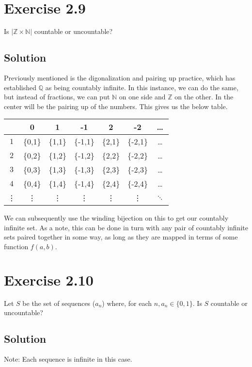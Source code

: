 \documentclass[12pt]{report}
\begin{document}
\pagebreak
\section{Exercise 2.9}
Is $|\mathbb{Z \times N}|$ countable or uncountable? 

\subsection*{Solution}
Previously mentioned is the digonalization and pairing up practice, which has established $\mathbb{Q}$ as being countably infinite. 
In this instance, we can do the same, but instead of fractions, we can put $\mathbb{N}$ on one side and $\mathbb{Z}$ on the other. 
In the center will be the pairing up of the numbers.
This gives us the below table.
\begin{center}
    \begin{tabular}{c| c c c c c c}
            &0  &1  &-1 &2  &-2 &\dots\\
        \hline
        $1$ &\{0,1\}    &\{1,1\}    &\{-1,1\}   &\{2,1\}    &\{-2,1\}   &\dots\\
        $2$ &\{0,2\}    &\{1,2\}    &\{-1,2\}   &\{2,2\}    &\{-2,2\}   &\dots\\
        $3$ &\{0,3\}    &\{1,3\}    &\{-1,3\}   &\{2,3\}    &\{-2,3\}   &\dots\\
        $4$ &\{0,4\}    &\{1,4\}    &\{-1,4\}   &\{2,4\}    &\{-2,4\}   &\dots\\
        \vdots&\vdots   &\vdots     &\vdots     &\vdots     &\vdots     &$\ddots$
    \end{tabular}
\end{center}

We can subsequently use the winding bijection on this to get our countably infinite set.
As a note, this can be done in turn with any pair of countably infinite sets paired together in some way, as long as they are mapped in terms of some function $f(a,b)$.

\pagebreak
\section{Exercise 2.10}
Let $S$ be the set of sequences ($a_n$) where, for  each $n, a_n \in \{0, 1\}$. Is $S$ countable or uncountable? 

\subsection*{Solution}
Note: Each sequence is infinite in this case.
\end{document}
